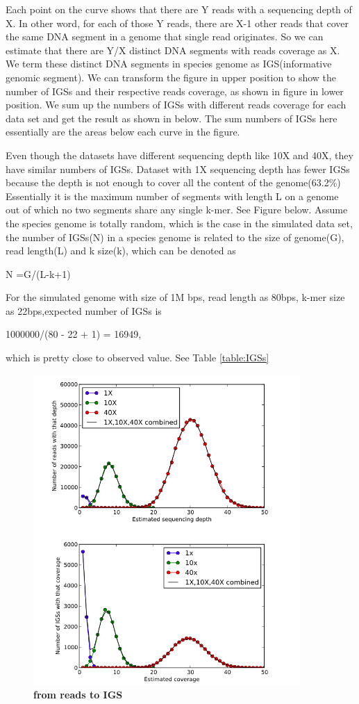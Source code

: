 \documentclass{article}
\begin{document}
Each point on the curve shows that there are Y reads with a sequencing depth of X. In other word, for each of those Y reads, there are X-1 other reads that cover the same DNA segment in a genome that single read originates. So we can estimate that there are Y/X distinct DNA segments with reads coverage as X. We term these distinct DNA segments in species genome as IGS(informative genomic segment). We can transform the figure in upper position to show the number of IGSs and their respective reads coverage, as shown in figure in lower position. We sum up the numbers of IGSs with different reads coverage for each data set and get the result as shown in below. The sum numbers of IGSs here essentially are the areas below each curve in the figure.

Even though the datasets have different sequencing depth like 10X and 40X, they have similar numbers of IGSs. Dataset with 1X sequencing depth has fewer IGSs because the depth is not enough to cover all the content of the genome(63.2\%) Essentially it is the maximum number of segments with length L on a genome out of which no two segments share any single k-mer. See Figure below. Assume the species genome is totally random, which is the case in the simulated data set, the number of IGSs(N) in a species genome is related to the size of genome(G), read length(L) and k size(k), which can be denoted as

N =G/(L-k+1)

For the simulated genome with size of 1M bps, read length as 80bps, k-mer size as 22bps,expected number of IGSs is 

1000000/(80 - 22 + 1) = 16949, 

which is pretty close to observed value. See Table \ref{table:IGSs}


\begin{figure}[!ht]
\centerline{\includegraphics[width=4in]{./figures/from_reads_to_IGS.png}}
\caption{\bf from reads to IGS}
\label{fig:reads_to_IGS}
\end{figure}
\end{document}
